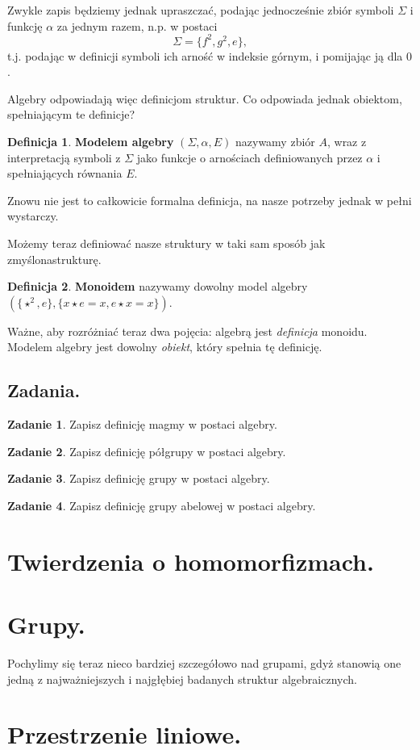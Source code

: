 \documentclass{article}
\theoremstyle{definition}
\newtheorem{definition}{Definicja}[section]
\newtheorem{exercise}{Zadanie}[section]
\begin{document}
Zwykle zapis będziemy jednak upraszczać, podając jednocześnie zbiór symboli $\Sigma$ i funkcję $\alpha$ za jednym razem, n.p. w postaci
\begin{equation}
	\Sigma = \{f^2, g^2, e\},
\end{equation}
t.j. podając w definicji symboli ich arność w indeksie górnym, i pomijając ją dla $0$.

Algebry odpowiadają więc definicjom struktur.
Co odpowiada jednak obiektom, spełniającym te definicje?

\begin{definition}
	\textbf{Modelem algebry} $(\Sigma, \alpha, E)$ nazywamy zbiór $A$,
	wraz z interpretacją symboli z $\Sigma$ jako funkcje o arnościach definiowanych przez $\alpha$ i spełniających równania $E$.
\end{definition}
Znowu nie jest to całkowicie formalna definicja,
na nasze potrzeby jednak w pełni wystarczy.

Możemy teraz definiować nasze struktury w taki sam sposób jak zmyślonastrukturę.
\begin{definition}
	\textbf{Monoidem} nazywamy dowolny model algebry $(\{\star^2, e\}, \{ x \star e = x, e \star x = x \})$.
\end{definition}

Ważne, aby rozróżniać teraz dwa pojęcia: algebrą jest \textit{definicja} monoidu.
Modelem algebry jest dowolny \textit{obiekt}, który spełnia tę definicję.

\subsection{Zadania.}

\begin{exercise}
	Zapisz definicję magmy w postaci algebry.
\end{exercise}
\begin{exercise}
	Zapisz definicję półgrupy w postaci algebry.
\end{exercise}
\begin{exercise}
	Zapisz definicję grupy w postaci algebry.
\end{exercise}
\begin{exercise}
	Zapisz definicję grupy abelowej w postaci algebry.
\end{exercise}

\section{Twierdzenia o homomorfizmach.}

\section{Grupy.}

Pochylimy się teraz nieco bardziej szczegółowo nad grupami,
gdyż stanowią one jedną z najważniejszych i najgłębiej badanych struktur algebraicznych.

\section{Przestrzenie liniowe.}
\end{document}
